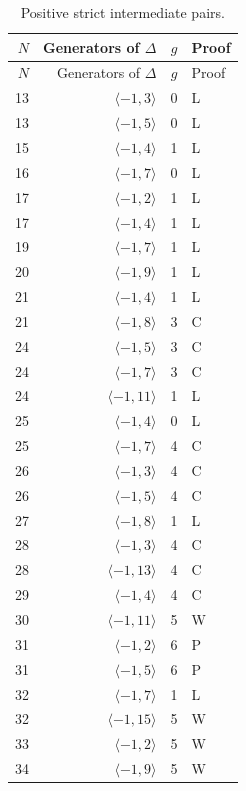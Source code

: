 \begin{longtable}{rrrl}
\caption{Positive strict intermediate pairs.}\label{tab:positive}\\
\toprule
$N$ & Generators of $\Delta$ & $g$ & Proof \\
\midrule\endfirsthead
\toprule $N$ & Generators of $\Delta$ & $g$ & Proof \\
\midrule\endhead
13 & $\langle -1, 3\rangle$ & 0 & L \\
13 & $\langle -1, 5\rangle$ & 0 & L \\
15 & $\langle -1, 4\rangle$ & 1 & L \\
16 & $\langle -1, 7\rangle$ & 0 & L \\
17 & $\langle -1, 2\rangle$ & 1 & L \\
17 & $\langle -1, 4\rangle$ & 1 & L \\
19 & $\langle -1, 7\rangle$ & 1 & L \\
20 & $\langle -1, 9\rangle$ & 1 & L \\
21 & $\langle -1, 4\rangle$ & 1 & L \\
21 & $\langle -1, 8\rangle$ & 3 & C \\
24 & $\langle -1, 5\rangle$ & 3 & C \\
24 & $\langle -1, 7\rangle$ & 3 & C \\
24 & $\langle -1, 11\rangle$ & 1 & L \\
25 & $\langle -1, 4\rangle$ & 0 & L \\
25 & $\langle -1, 7\rangle$ & 4 & C \\
26 & $\langle -1, 3\rangle$ & 4 & C \\
26 & $\langle -1, 5\rangle$ & 4 & C \\
27 & $\langle -1, 8\rangle$ & 1 & L \\
28 & $\langle -1, 3\rangle$ & 4 & C \\
28 & $\langle -1, 13\rangle$ & 4 & C \\
29 & $\langle -1, 4\rangle$ & 4 & C \\
30 & $\langle -1, 11\rangle$ & 5 & W \\
31 & $\langle -1, 2\rangle$ & 6 & P \\
31 & $\langle -1, 5\rangle$ & 6 & P \\
32 & $\langle -1, 7\rangle$ & 1 & L \\
32 & $\langle -1, 15\rangle$ & 5 & W \\
33 & $\langle -1, 2\rangle$ & 5 & W \\
34 & $\langle -1, 9\rangle$ & 5 & W \\

\end{longtable}
